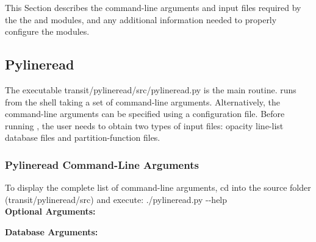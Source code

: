 \documentclass[letterpaper, 12pt]{article}
\begin{document}
This Section describes the command-line arguments and input files
required by the the {\pylineread} and {\transit} modules, and any
additional information needed to properly configure the modules.

\subsection{Pylineread}
\label{sec:inp-pyline}

The executable {\tttm transit/pylineread/src/pylineread.py} is the
main {\pylineread} routine.  {\pylineread} runs from the shell taking a
set of command-line arguments.  Alternatively, the command-line
arguments can be specified using a configuration file.  
Before running {\pylineread}, the user needs to obtain two types of
input files: opacity line-list database files and partition-function files.

\subsubsection{Pylineread Command-Line Arguments}

To display the complete list of command-line arguments, cd into the
{\pylineread} source folder ({\tttm transit/pylineread/src}) and
execute: \newline
{\tttb ./pylineread.py {-}{-}help} \\

{\bf Optional Arguments:} \newline
{}




{\bf Database Arguments:} \newline
{}



\end{document}
